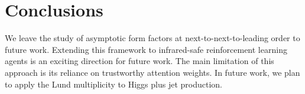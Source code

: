 \section{Conclusions}\label{sec:conclusions}

We leave the study of asymptotic form factors at next-to-next-to-leading
order to future work. Extending this framework to infrared-safe
reinforcement learning agents is an exciting direction for future work.
The main limitation of this approach is its reliance on trustworthy
attention weights. In future work, we plan to apply the Lund
multiplicity to Higgs plus jet production.

